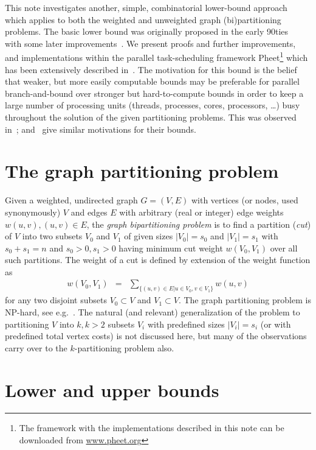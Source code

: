 \documentclass[a4paper,11pt]{article}
\begin{document}
This note investigates another, simple, combinatorial lower-bound
approach which applies to both the weighted and unweighted graph
(bi)partitioning problems. The basic lower bound was originally
proposed in the early 90ties~\cite{Traff91:or,Traff94:ppl} with some
later improvements~\cite{Traff96:slb}. We present proofs and further
improvements, and implementations within the parallel task-scheduling
framework Pheet\footnote{The framework with the implementations
  described in this note can be downloaded from \url{www.pheet.org}}
which has been extensively described in~\cite{Wimmer14:diss}. The
motivation for this bound is the belief that weaker, but more easily
computable bounds may be preferable for parallel branch-and-bound over
stronger but hard-to-compute bounds in order to keep a large number of
processing units (threads, processes, cores, processors, \ldots) busy
throughout the solution of the given partitioning problems. This was
observed in~\cite{Traff94:ppl};
and~\cite{BudiuDellingWerneck11,DellingGoldbergRazenshteynWerneck12}
  give similar motivations for their bounds.

\section{The graph partitioning problem}

Given a weighted, undirected graph $G=(V,E)$ with vertices (or nodes,
used synonymously) $V$ and edges $E$ with arbitrary (real or integer)
edge weights $w(u,v), (u,v)\in E$, the \emph{graph bipartitioning
  problem} is to find a partition (\emph{cut}) of $V$ into two subsets
$V_0$ and $V_1$ of given sizes $|V_0|=s_0$ and $|V_1|=s_1$ with
$s_0+s_1=n$ and $s_0>0, s_1>0$ having minimum cut weight $w(V_0,V_1)$
over all such partitions. The weight of a cut is defined by extension
of the weight function as
\begin{eqnarray*}
w(V_0,V_1) & = & \sum_{\{(u,v)\in E | u\in V_0,v\in V_1\}}w(u,v)
\end{eqnarray*}
for any two disjoint subsets $V_0\subset V$ and $V_1\subset V$. The
graph partitioning problem is NP-hard, see
e.g.~\cite{GareyJohnson79,GareyJohnsonStockmeyer76}. The natural (and
relevant) generalization of the problem to partitioning $V$ into $k,
k>2$ subsets $V_i$ with predefined sizes $|V_i|=s_i$ (or with
predefined total vertex costs) is not discussed here, but many of the
observations carry over to the $k$-partitioning problem also.


\section{Lower and upper bounds}
\end{document}
